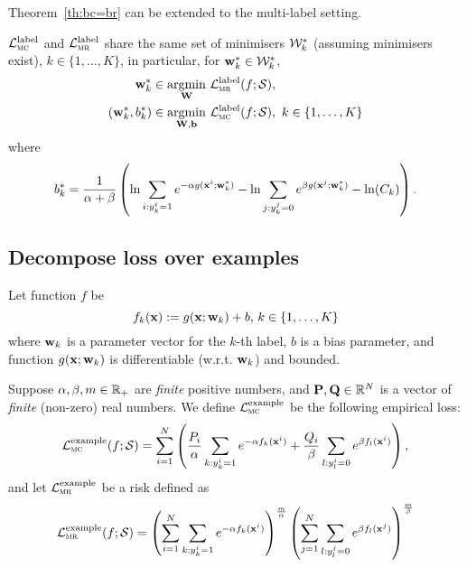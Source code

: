 Theorem~\ref{th:bc=br} can be extended to the multi-label setting.
\begin{theorem}
\label{theorem:mc1=mr1}
$\mathcal{L}_\textsc{mc}^\mathrm{label}$ and $\mathcal{L}_\textsc{mr}^\mathrm{label}$ share the same set of minimisers $\mathcal{W}_k^*$
(assuming minimisers exist), $k \in \{1,\dots,K\}$, in particular, for $\mathbf{w}_k^* \in \mathcal{W}_k^*$,
\begin{equation*}
\begin{aligned}
         \mathbf{w}_k^* & \in \operatorname*{argmin}_{\mathbf{W}}     \, \mathcal{L}_\textsc{mr}^\mathrm{label}(f; \mathcal{S}), \\
(\mathbf{w}_k^*, b_k^*) & \in \operatorname*{argmin}_{\mathbf{W},\mathbf{b}} \, \mathcal{L}_\textsc{mc}^\mathrm{label}(f; \mathcal{S}), \ k \in \{1,\dots,K\}
\end{aligned}
\end{equation*}
where
$$
b_k^*
= \frac{1}{\alpha + \beta} \left(
  \ln \sum_{i: y_k^i = 1} e^{-\alpha g(\mathbf{x}^i; \mathbf{w}_k^*)} - \ln \sum_{j: y_k^j = 0} e^{\beta g(\mathbf{x}^j; \mathbf{w}_k^*)} - \ln (C_k) \right).
$$
\end{theorem}


\subsection{Decompose loss over examples}

Let function $f$ be
\begin{equation*}
f_k(\mathbf{x}) := g(\mathbf{x}; \mathbf{w}_k) + b, \, k \in \{1,\dots,K\}
\end{equation*}
where $\mathbf{w}_k$ is a parameter vector for the $k$-th label, $b$ is a bias parameter, 
and function $g(\mathbf{x}; \mathbf{w}_k)$ is differentiable (w.r.t. $\mathbf{w}_k$) and bounded.

Suppose $\alpha, \beta, m \in \mathbb{R}_+$ are \emph{finite} positive numbers, 
and $\mathbf{P}, \mathbf{Q} \in \mathbb{R}^N$ is a vector of \emph{finite} (non-zero) real numbers.
We define $\mathcal{L}_\textsc{mc}^\mathrm{example}$ be the following empirical loss:
\begin{equation}
\label{eq:mc2}
\displaystyle
\mathcal{L}_\textsc{mc}^\mathrm{example}(f; \mathcal{S})
= \sum_{i=1}^N \left(
  \frac{P_i}{\alpha} \sum_{k: y_k^i = 1} e^{-\alpha f_k(\mathbf{x}^i)} + 
  \frac{Q_i}{\beta}  \sum_{l: y_l^i = 0} e^{ \beta  f_l(\mathbf{x}^i)} \right),
\end{equation}
and let $\mathcal{L}_\textsc{mr}^\mathrm{example}$ be a risk defined as
\begin{equation}
\label{eq:mr2}
\displaystyle
\mathcal{L}_\textsc{mr}^\mathrm{example}(f; \mathcal{S})
= \left( \sum_{i=1}^N \sum_{k: y_k^i = 1} e^{-\alpha f_k(\mathbf{x}^i)} \right)^\frac{m}{\alpha}
  \left( \sum_{j=1}^N \sum_{l: y_l^j = 0} e^{\beta f_l(\mathbf{x}^j)} \right)^\frac{m}{\beta}
\end{equation}


